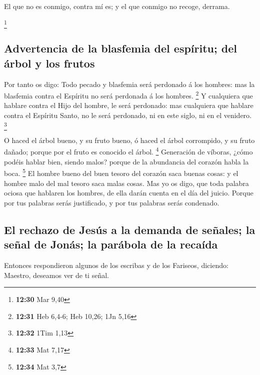  El que no es conmigo, contra mí es; y el que conmigo no
recoge, derrama.

\footnote{\textbf{12:30} Mar 9,40}

\hypertarget{advertencia-de-la-blasfemia-del-espuxedritu-del-uxe1rbol-y-los-frutos}{%
\subsection{Advertencia de la blasfemia del espíritu; del árbol y los
frutos}\label{advertencia-de-la-blasfemia-del-espuxedritu-del-uxe1rbol-y-los-frutos}}

 Por tanto os digo: Todo pecado y blasfemia será perdonado
á los hombres: mas la blasfemia contra el Espíritu no será perdonada á
los hombres. \footnote{\textbf{12:31} Heb 6,4-6; Heb 10,26; 1Jn 5,16}
 Y cualquiera que hablare contra el Hijo del hombre, le
será perdonado: mas cualquiera que hablare contra el Espíritu Santo, no
le será perdonado, ni en este siglo, ni en el venidero. \footnote{\textbf{12:32}
  1Tim 1,13}

 O haced el árbol bueno, y su fruto bueno, ó haced el árbol
corrompido, y su fruto dañado; porque por el fruto es conocido el árbol.
\footnote{\textbf{12:33} Mat 7,17}  Generación de víboras,
¿cómo podéis hablar bien, siendo malos? porque de la abundancia del
corazón habla la boca. \footnote{\textbf{12:34} Mat 3,7} 
El hombre bueno del buen tesoro del corazón saca buenas cosas: y el
hombre malo del mal tesoro saca malas cosas.  Mas yo os
digo, que toda palabra ociosa que hablaren los hombres, de ella darán
cuenta en el día del juicio.  Porque por tus palabras serás
justificado, y por tus palabras serás condenado.

\hypertarget{el-rechazo-de-jesuxfas-a-la-demanda-de-seuxf1ales-la-seuxf1al-de-jonuxe1s-la-paruxe1bola-de-la-recauxedda}{%
\subsection{El rechazo de Jesús a la demanda de señales; la señal de
Jonás; la parábola de la
recaída}\label{el-rechazo-de-jesuxfas-a-la-demanda-de-seuxf1ales-la-seuxf1al-de-jonuxe1s-la-paruxe1bola-de-la-recauxedda}}

 Entonces respondieron algunos de los escribas y de los
Fariseos, diciendo: Maestro, deseamos ver de ti señal.

